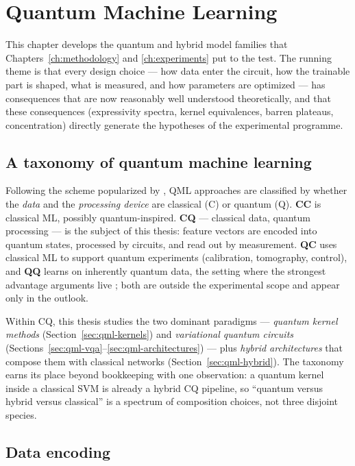 \chapter{Quantum Machine Learning}
\label{ch:qml}

This chapter develops the quantum and hybrid model families that
Chapters~\ref{ch:methodology} and \ref{ch:experiments} put to the test. The
running theme is that every design choice --- how data enter the circuit, how
the trainable part is shaped, what is measured, and how parameters are
optimized --- has consequences that are now reasonably well understood
theoretically, and that these consequences (expressivity spectra, kernel
equivalences, barren plateaus, concentration) directly generate the hypotheses
of the experimental programme.

\section{A taxonomy of quantum machine learning}
\label{sec:qml-taxonomy}

Following the scheme popularized by \citet{schuld2021book}, QML approaches are
classified by whether the \emph{data} and the \emph{processing device} are
classical (C) or quantum (Q). \textbf{CC} is classical ML, possibly
quantum-inspired. \textbf{CQ} --- classical data, quantum processing --- is
the subject of this thesis: feature vectors are encoded into quantum states,
processed by circuits, and read out by measurement. \textbf{QC} uses
classical ML to support quantum experiments (calibration, tomography,
control), and \textbf{QQ} learns on inherently quantum data, the setting where
the strongest advantage arguments live \citep{huang2022advantage}; both are
outside the experimental scope and appear only in the outlook.

Within CQ, this thesis studies the two dominant paradigms --- \emph{quantum
kernel methods} (Section~\ref{sec:qml-kernels}) and \emph{variational quantum
circuits} (Sections~\ref{sec:qml-vqa}--\ref{sec:qml-architectures}) --- plus
\emph{hybrid architectures} that compose them with classical networks
(Section~\ref{sec:qml-hybrid}). The taxonomy earns its place beyond
bookkeeping with one observation: a quantum kernel inside a classical SVM is
already a hybrid CQ pipeline, so ``quantum versus hybrid versus classical'' is
a spectrum of composition choices, not three disjoint species.

\section{Data encoding}
\label{sec:qml-encoding}

